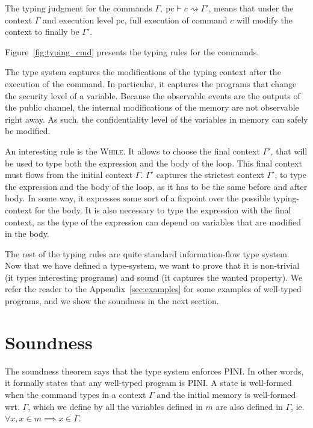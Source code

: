 \documentclass[10pt]{article}
\newcommand{\pc}{\mathrm{pc}}
\newcommand{\ctx}{\Gamma}
\newcommand{\typing}[4]{ #1,~#2 \vdash #3 \rightsquigarrow #4}
\begin{document}
The typing judgment for the commands \( \typing{\ctx}{\pc}{c}{\ctx'} \), means that under the context
\( \ctx \) and execution level \( \pc \), full execution of command \( c \) will modify the context to finally be $\ctx'$.

Figure~\ref{fig:typing_cmd} presents the typing rules for the commands.


The type system captures the modifications of the typing context after the execution of the command.
In particular, it captures the programs that change the security level of a variable. Because the
observable events are the outputs of the public channel, the internal modifications of the memory are
not observable right away. As such, the confidentiality level of the variables in memory can safely
be modified.

An interesting rule is the \textsc{While}. It allows to choose the final context $\ctx'$, that will
be used to type both the expression and the body of the loop. This final context must flows from the
initial context $\ctx$.
$\ctx'$ captures the strictest context $\ctx'$, to type the expression and the
body of the loop, as it has to be the same before and after body. In some way, it expresses some
sort of a fixpoint over the possible typing-context for the body. It is also necessary to type the
expression with the final context, as the type of the expression can depend on variables that are
modified in the body.

The rest of the typing rules are quite standard information-flow type system. Now that we have
defined a type-system, we want to prove that it is non-trivial (it types interesting programs) and
sound (it captures the wanted property). We refer the reader to the
Appendix~\ref{sec:examples} for some examples of well-typed programs, and we show the soundness in
the next section.

\section{Soundness}%
\label{sec:soundness}

The soundness theorem says that the type system enforces PINI. In other words, it formally states
that any well-typed program is PINI. A state is well-formed when the command types in a context \( \Gamma \) and the initial memory is well-formed wrt. \( \ctx \), which we define by 
all the variables defined in $m$
are also defined in $\ctx$, ie. $\forall x, x \in m \implies x \in \ctx$.
\end{document}
